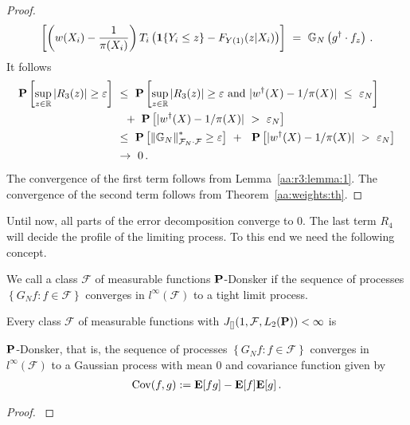 \begin{proof}
\begin{align*}
    \left[ 
    \left( 
    w(X_i) 
    -
    \frac{1}{\pi(X_i)}
    \right)
    T_i
    \left( 
    \mathbf{1}{\left\{ Y_i \le z \right\}}
    -
  F_{Y(1)}(z|X_i)
    \right)
    \right]
    \ 
    =
    \ 
    \G_N
    \left( 
      g^\dagger
      \cdot
      f_z
    \right)
    \,.
  \end{align*}
  It follows
\begin{align*}
    \P
    \left[ 
      \sup_{z\in\R}
     | 
    R_3(z)
    |
      \ge
      \varepsilon
    \right]
    &
    \ 
    \le
    \ 
    \P
    \left[ 
      \sup_{z\in\R}
     | 
    R_3(z)
    |
      \ge
      \varepsilon
      \ 
      \text{and}
      \ 
    | 
    w^\dagger(X)- 1/\pi(X)
    |
    \ 
    \le
    \ 
    \varepsilon_N
    \right]
    \\
    &
    \quad
    +
    \ 
    \P
    \left[ 
    | 
    w^\dagger(X)- 1/\pi(X)
    |
    \ 
    >
    \ 
    \varepsilon_N
    \right]
    \\
    &
    \ 
    \le
    \ 
    \P
    \left[ 
      \norm{\G_N}^*_{\mathcal{F}_N\cdot\mathcal{F}}
      \ge
      \varepsilon
    \right]
    \ 
    +
    \ 
    \ 
    \P
    \left[ 
    | 
    w^\dagger(X)- 1/\pi(X)
    |
    \ 
    >
    \ 
    \varepsilon_N
    \right]
    \\
    &
    \ 
    \to
    \ 
    0
    \,.
\end{align*}
The convergence of the first term follows from
Lemma~\ref{aa:r3:lemma:1}.
The convergence of the second term follows from
Theorem~\ref{aa:weights:th}.

\end{proof}


Until now, all parts of the error decomposition converge to 0.
The last term $R_4$ will decide the profile of the limiting process.
To this end we need the following concept.
\begin{definition}
  We call a class 
  $\mathcal{F}$ of measurable functions 
$\P$-Donsker
if the sequence of processes 
$\left\{ G_N f \colon f\in\mathcal{F}\right\}$
converges in
$l^\infty(\mathcal{F})$
to a tight limit process.
\end{definition}

\begin{theorem}
  Every class $\mathcal{F}$ of measurable functions 
  with
  $
    J
    _{[]}
    (
    1
    ,
    \mathcal{F}
    ,
    L_2(\P)
    )
    <\infty
  $
  is

  $\P$-Donsker, that is,
  the sequence of processes 
$\left\{ G_N f \colon f\in\mathcal{F}\right\}$
  converges 
  in
$l^\infty(\mathcal{F})$
to a Gaussian process with mean 0 and covariance function given by
\begin{gather}
  \mathrm{Cov}(f,g)
  :=
  \E[fg]-\E[f]\E[g]
  \,.
\end{gather}
\end{theorem}
\begin{proof}
  \cite[Theorem~19.5]{Vaart2000}
\end{proof}



